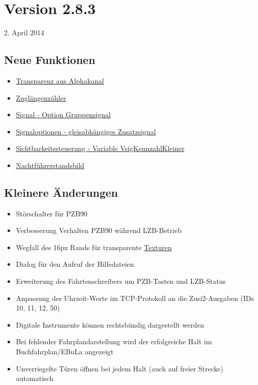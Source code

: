 \section{Version 2.8.3}\hfill 2. April 2014

\subsection{Neue Funktionen}
\begin{itemize}
\item \hyperref[sec:editor-obj-transparenz]{Transparenz aus Alphakanal}
\item \hyperref[sec.sim.steuerung.diverses.wegmessung]{Zuglängenzähler}
\item \hyperref[paragraph.editor.gleis.gleiseigenschaften.signal.optiongruppensignal] {Signal - Option Gruppensignal}
\item \hyperref[subsubsec.editor.gleis.gleiseigenschaften.signaloptionen]{Signaloptionen - gleisabhängiges Zusatzsignal}
\item \hyperref[sec.editor.obj.logischeausdruecke]{Sichtbarkeitssteuerung - Variable VsigKennzahlKleiner}
\item \hyperref[sect.editor.lok.fst]{Nachtführerstandsbild}
\end{itemize}

\subsection{Kleinere Änderungen}
\begin{itemize}
\item Störschalter für PZB90
\item Verbesserung Verhalten PZB90 während LZB-Betrieb
\item Wegfall des 16px Rands für transparente \hyperref[sec:editor-obj-textur]{Texturen}
\item Dialog für den Aufruf der Hilfedateien
\item Erweiterung des Fahrtenschreibers um PZB-Tasten und LZB-Status
\item Anpassung der Uhrzeit-Werte im TCP-Protokoll an die Zusi2-Ausgaben (IDs 10, 11, 12, 50)
\item Digitale Instrumente können rechtsbündig dargestellt werden
\item Bei fehlender Fahrplandarstellung wird der erfolgreiche Halt im Buchfahrplan/EBuLa angezeigt
\item Unverriegelte Türen öffnen bei jedem Halt (auch auf freier Strecke) automatisch 
\end{itemize}

